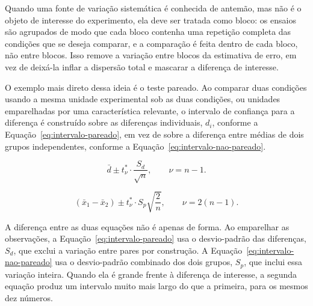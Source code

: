 \documentclass{doeapostila}
\begin{document}
Quando uma fonte de variação sistemática é conhecida de antemão, mas não é
o objeto de interesse do experimento, ela deve ser tratada como bloco: os
ensaios são agrupados de modo que cada bloco contenha uma repetição
completa das condições que se deseja comparar, e a comparação é feita
dentro de cada bloco, não entre blocos. Isso remove a variação entre blocos
da estimativa de erro, em vez de deixá-la inflar a dispersão total e
mascarar a diferença de interesse.

O exemplo mais direto dessa ideia é o teste pareado. Ao comparar duas
condições usando a mesma unidade experimental sob as duas condições, ou
unidades emparelhadas por uma característica relevante, o intervalo de
confiança para a diferença é constru\'ido sobre as diferenças individuais,
$d_{i}$, conforme a Equação~\eqref{eq:intervalo-pareado}, em vez de sobre a
diferença entre médias de dois grupos independentes, conforme a
Equação~\eqref{eq:intervalo-nao-pareado}.

\begin{equation}
  \bar{d} \pm t^{*}_{\nu} \cdot \frac{S_{d}}{\sqrt{n}} ,
  \qquad \nu = n - 1 .
  \label{eq:intervalo-pareado}
\end{equation}

\begin{equation}
  (\bar{x}_{1} - \bar{x}_{2}) \pm t^{*}_{\nu} \cdot S_{p}\sqrt{\frac{2}{n}} ,
  \qquad \nu = 2(n-1) .
  \label{eq:intervalo-nao-pareado}
\end{equation}

A diferença entre as duas equações não é apenas de forma. Ao emparelhar as
observações, a Equação~\eqref{eq:intervalo-pareado} usa o desvio-padrão das
diferenças, $S_{d}$, que exclui a variação entre pares por construção. A
Equação~\eqref{eq:intervalo-nao-pareado} usa o desvio-padrão combinado dos
dois grupos, $S_{p}$, que inclui essa variação inteira. Quando ela é grande
frente à diferença de interesse, a segunda equação produz um intervalo
muito mais largo do que a primeira, para os mesmos dez números.
\end{document}
